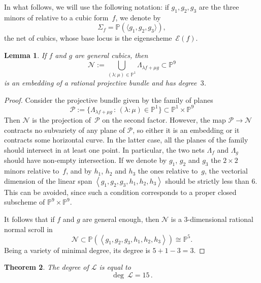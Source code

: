 \documentclass{amsart}
\theoremstyle{plain}
\newtheorem{lemma}{Lemma}[section]
\newtheorem{theorem}[lemma]{Theorem}
\theoremstyle{definition}
\newcommand{\p}{\mathbb{P}}
\newcommand{\Eig}[1]{\mathcal{E}\!\left( {#1} \right)}
\begin{document}
In what follows, we will use the following notation: if $g_1, g_2, g_3$ are the three minors of  relative
to a cubic form~$f$, we denote by
$$
\Sigma_f = \p( \langle g_1, g_2, g_3 \rangle),
$$
the net of cubics, whose base locus is the eigenscheme~$\Eig{f}$.
%
\begin{lemma}
\label{lemma:scroll}
 If $f$ and $g$ are general cubics, then
 \[
   \mathcal{N} := \bigcup_{(\lambda : \mu) \in \p^1} \Lambda_{\lambda f + \mu g} \subset \p^9
 \]
 is an embedding of a rational projective bundle and has degree~$3$.
\end{lemma}
\begin{proof}
Consider the projective bundle given by the family of planes
%
\[
 \mathcal{P} := \{ \Lambda_{\lambda f + \mu g} \, : \, (\lambda: \mu) \in \p^1 \} \subset \p^1 \times \p^9
\]
%
Then $\mathcal{N}$ is the projection of~$\mathcal{P}$ on the second factor.
However, the map $\mathcal{P} \to \mathcal{N}$ contracts no subvariety of any plane of ${\mathcal P}$, so either it is an embedding or it contracts some horizontal curve. In the latter case, all the planes of the family should intersect in at least one point. In particular, the two nets $\Lambda_f$ and $\Lambda_g$ should have non-empty intersection.
If we denote by $g_1$, $g_2$ and $g_3$ the $2 \times 2$ minors relative to~$f$, and by $h_1$, $h_2$ and $h_3$ the ones relative to~$g$, the vectorial dimension of the linear span $\left\langle g_1, g_2, g_3, h_1, h_2, h_3 \right\rangle$ should be strictly less than $6$. This can be avoided, since such a condition corresponds to a proper closed subscheme of $\p^9 \times \p^9$.

It follows that if $f$ and $g$ are general enough, then $\mathcal{N}$ is a $3$-dimensional rational normal scroll in
%
\[
\mathcal{N} \subset \p(\left\langle g_1, g_2, g_3, h_1, h_2, h_3 \right\rangle) \cong \p^5.
\]
%
Being a variety of minimal degree, its degree is $5+1-3 = 3$.
\end{proof}

\begin{theorem}
The degree of $\mathcal{L}$ is equal to
%
\[
  \deg \ \mathcal{L} = 15 \,.
\]
%
\end{theorem}
\end{document}
